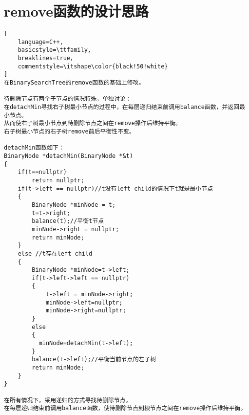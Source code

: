 \documentclass[UTF8]{ctexart}
\begin{document}
\pagestyle{fancy}
\fancyhead{}

\section{remove函数的设计思路}
\begin{lstlisting}[
    language=C++,
    basicstyle=\ttfamily,
    breaklines=true，
    commentstyle=\itshape\color{black!50!white}
]
在BinarySearchTree的remove函数的基础上修改。

待删除节点有两个子节点的情况特殊，单独讨论：
在detachMin寻找右子树最小节点的过程中，在每层递归结束前调用balance函数，并返回最小节点。
从而使右子树最小节点到待删除节点之间在remove操作后维持平衡。
右子树最小节点的右子树remove前后平衡性不变。

detachMin函数如下：
BinaryNode *detachMin(BinaryNode *&t)
{
    if(t==nullptr)
        return nullptr;
    if(t->left == nullptr)//t没有left child的情况下t就是最小节点
    {
        BinaryNode *minNode = t;
        t=t->right; 
        balance(t);//平衡t节点
        minNode->right = nullptr;
        return minNode;
    }
    else //t存在left child
    {   
        BinaryNode *minNode=t->left;
        if(t->left->left == nullptr)
        {
            t->left = minNode->right;
            minNode->left=nullptr;
            minNode->right=nullptr;
        }
        else
        {
          minNode=detachMin(t->left);
        }
        balance(t->left);//平衡当前节点的左子树
        return minNode;
    }
}

在所有情况下，采用递归的方式寻找待删除节点。
在每层递归结束前调用balance函数，使待删除节点到根节点之间在remove操作后维持平衡。

\end{lstlisting}
\end{document}
